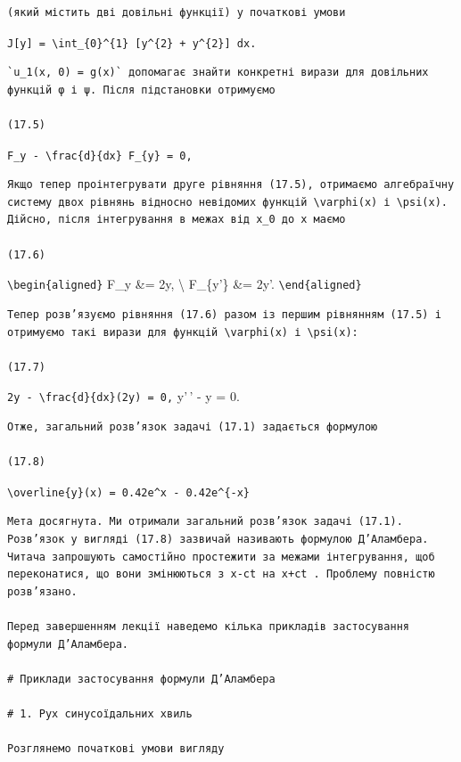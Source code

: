 \documentclass[
  ukrainian,
]{article}
\begin{document}
\begin{verbatim}
(який містить дві довільні функції) у початкові умови
\end{verbatim}

\texttt{J{[}y{]}\ =\ \textbackslash{}int\_\{0\}\^{}\{1\}\ {[}y\^{}\{2\}\ +\ y\textquotesingle{}\^{}\{2\}{]}\ dx.}

\begin{verbatim}
`u_1(x, 0) = g(x)` допомагає знайти конкретні вирази для довільних функцій φ і ψ. Після підстановки отримуємо

(17.5)
\end{verbatim}

\texttt{F\_y\ -\ \textbackslash{}frac\{d\}\{dx\}\ F\_\{y\textquotesingle{}\}\ =\ 0,}

\begin{verbatim}
Якщо тепер проінтегрувати друге рівняння (17.5), отримаємо алгебраїчну систему двох рівнянь відносно невідомих функцій \varphi(x) і \psi(x). Дійсно, після інтегрування в межах від x_0 до x маємо

(17.6)
\end{verbatim}

\texttt{\textbackslash{}begin\{aligned\}} F\_y \&= 2y, \textbackslash{}
F\_\{y'\} \&= 2y'. \texttt{\textbackslash{}end\{aligned\}}

\begin{verbatim}
Тепер розв’язуємо рівняння (17.6) разом із першим рівнянням (17.5) і отримуємо такі вирази для функцій \varphi(x) і \psi(x):

(17.7)
\end{verbatim}

\texttt{2y\ -\ \textbackslash{}frac\{d\}\{dx\}(2y\textquotesingle{})\ =\ 0,}
y'\,' - y = 0.

\begin{verbatim}
Отже, загальний розв’язок задачі (17.1) задається формулою

(17.8)
\end{verbatim}

\texttt{\textbackslash{}overline\{y\}(x)\ =\ 0.42e\^{}x\ -\ 0.42e\^{}\{-x\}}

\begin{verbatim}
Мета досягнута. Ми отримали загальний розв’язок задачі (17.1). Розв’язок у вигляді (17.8) зазвичай називають формулою Д’Аламбера. Читача запрошують самостійно простежити за межами інтегрування, щоб переконатися, що вони змінюються з x-ct на x+ct . Проблему повністю розв’язано.

Перед завершенням лекції наведемо кілька прикладів застосування формули Д’Аламбера.

# Приклади застосування формули Д’Аламбера

# 1. Рух синусоїдальних хвиль

Розглянемо початкові умови вигляду
\end{verbatim}
\end{document}
